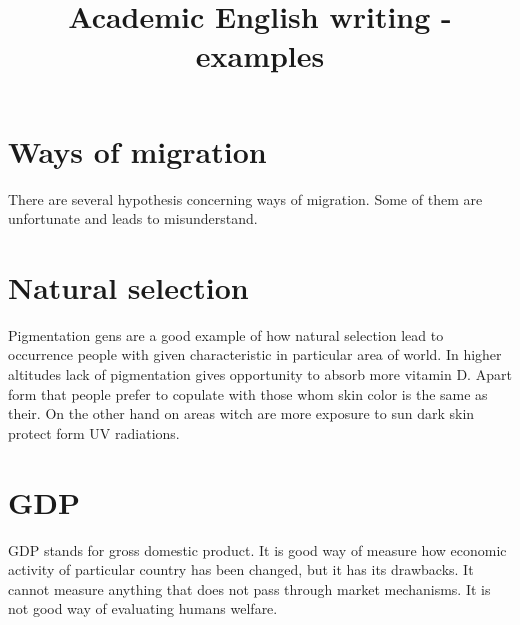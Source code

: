 \documentclass[a4paper,11pt]{article}
\title{Academic English writing - examples}
\begin{document}
\section{Ways of migration}
There are several hypothesis concerning ways of migration. Some of them are unfortunate and leads to misunderstand.

\section{Natural selection}
Pigmentation gens are a good example of how natural selection lead to occurrence people with given characteristic in particular area of world. In higher altitudes lack of pigmentation gives opportunity to absorb more vitamin D. Apart form that people prefer to copulate with those whom skin color is the same as their. On the other hand on areas witch are more exposure to sun dark skin protect form UV radiations.  

\section{GDP}
GDP stands for gross domestic product. It is good way of measure how economic activity of particular country has been changed, but it has its drawbacks. It cannot measure anything that does not pass through market mechanisms. It is not good way of evaluating humans welfare.
\end{document}
